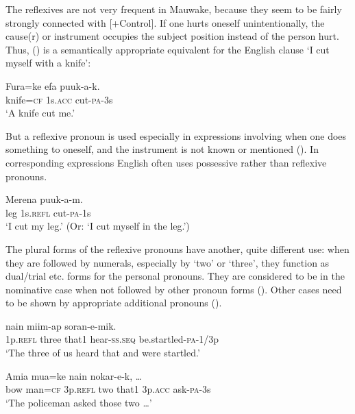 The reflexives are not very frequent in Mauwake, because they seem to be fairly strongly connected with [+Control]. If one hurts oneself unintentionally, the cause(r) or instrument occupies the subject position instead of the person hurt. Thus, () is a semantically appropriate equivalent for the English clause `I cut myself with a knife':

\ea%
\label{ex:x617}
\gll Fura=ke efa puuk-a-k. \\
knife=\textsc{cf} 1s.\textsc{acc} cut-\textsc{pa}-3s\\
\glt`A knife cut me.'
\z

But a reflexive pronoun is used especially in expressions involving  when one does something to oneself, and the instrument is not known or mentioned (). In corresponding expressions English often uses possessive rather than reflexive pronouns.

\ea%
\label{ex:x618}
\gll Merena  puuk-a-m. \\
leg 1s.\textsc{refl} cut-\textsc{pa}-1s\\
\glt`I cut my leg.' (Or: `I cut myself in the leg.')
\z

The plural forms of the reflexive pronouns have another, quite different use: when they are followed by numerals, especially by `two' or `three', they function as dual/trial etc. forms for the personal pronouns. They are considered to be in the nominative case when not followed by other pronoun forms (). Other cases need to be shown by appropriate additional pronouns ().

\ea%
\label{ex:x615}
\gll {}  nain miim-ap soran-e-mik. \\
1p.\textsc{refl} three that1 hear-\textsc{ss}.\textsc{seq} be.startled-\textsc{pa}-1/3p\\
\glt`The three of us heard that and were startled.'
\z

\ea%
\label{ex:x616}
\gll Amia mua=ke   nain  nokar-e-k, {\dots} \\
bow man=\textsc{cf} 3p.\textsc{refl} two that1 3p.\textsc{acc} ask-\textsc{pa}-3s\\
\glt`The policeman asked those two {\dots}'
\z

